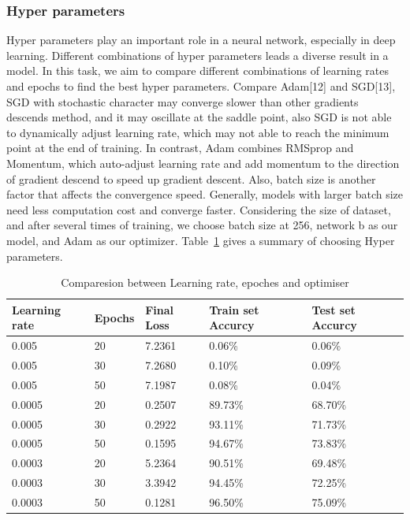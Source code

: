 \documentclass[runningheads]{llncs}
\begin{document}
\subsubsection{Hyper parameters}
Hyper parameters play an important role in a neural network, especially in deep learning. Different combinations of hyper parameters leads a diverse result in a model. In this task, we aim to compare different combinations of learning rates and epochs to find the best hyper parameters. Compare Adam[12] and SGD[13], SGD with stochastic character may converge slower than other gradients descends method, and it may oscillate at the saddle point, also SGD is not able to dynamically adjust learning rate, which may not able to reach the minimum point at the end of training. In contrast, Adam combines RMSprop and Momentum, which auto-adjust learning rate and add momentum to the direction of gradient descend to speed up gradient descent. Also, batch size is another factor that affects the convergence speed. Generally, models with larger batch size need less computation cost and converge faster. Considering the size of dataset, and after several times of training, we choose batch size at 256, network b as our model, and Adam as our optimizer. Table~\ref{tab2} gives a summary of choosing Hyper parameters.

\begin{table}
	\caption{Comparesion between Learning rate, epoches and optimiser}\label{tab2}
	\begin{center}
		\begin{tabular}{|l|l|l|l|l|}
			\hline
			Learning rate & Epochs & Final Loss & Train set Accurcy & Test set Accurcy\\
			\hline
			0.005 & 20 & 7.2361 & 0.06\%  & 0.06\%\\
			0.005 & 30 & 7.2680 & 0.10\%  & 0.09\%\\
			0.005 & 50 & 7.1987 & 0.08\%  & 0.04\%\\
			\hline
			0.0005 & 20 & 0.2507  & 89.73\%  & 68.70\%\\
			0.0005 & 30 & 0.2922  & 93.11\%  & 71.73\%\\
			0.0005 & 50 & 0.1595  & 94.67\%  & 73.83\%\\
			\hline
			0.0003 & 20 & 5.2364  & 90.51\%  & 69.48\%\\
			0.0003 & 30 & 3.3942  & 94.45\%  & 72.25\%\\
			0.0003 & 50 & 0.1281  & 96.50\%  & 75.09\%\\
			\hline
		\end{tabular}
	\end{center}
\end{table}
\end{document}
